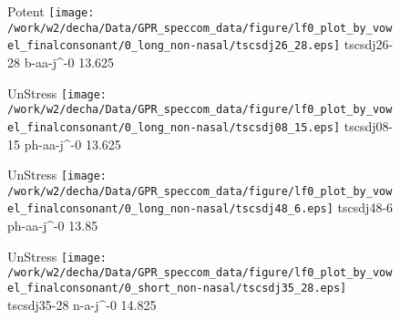 \documentclass{article}
\begin{document}
\begin{figure}[t]
\begin{minipage}[b]{.24\textwidth}
\colorbox{Apricot}{Potent}
\centering
\texttt{[image: /work/w2/decha/Data/GPR\_speccom\_data/figure/lf0\_plot\_by\_vowel\_finalconsonant/0\_long\_non-nasal/tscsdj26\_28.eps]}
tscsdj26-28 b-aa-j\textasciicircum-0 13.625
\end{minipage}
\begin{minipage}[b]{.24\textwidth}
UnStress
\centering
\texttt{[image: /work/w2/decha/Data/GPR\_speccom\_data/figure/lf0\_plot\_by\_vowel\_finalconsonant/0\_long\_non-nasal/tscsdj08\_15.eps]}
tscsdj08-15 ph-aa-j\textasciicircum-0 13.625
\end{minipage}
\begin{minipage}[b]{.24\textwidth}
UnStress
\centering
\texttt{[image: /work/w2/decha/Data/GPR\_speccom\_data/figure/lf0\_plot\_by\_vowel\_finalconsonant/0\_long\_non-nasal/tscsdj48\_6.eps]}
tscsdj48-6 ph-aa-j\textasciicircum-0 13.85
\end{minipage}
\begin{minipage}[b]{.24\textwidth}
UnStress
\centering
\texttt{[image: /work/w2/decha/Data/GPR\_speccom\_data/figure/lf0\_plot\_by\_vowel\_finalconsonant/0\_short\_non-nasal/tscsdj35\_28.eps]}
tscsdj35-28 n-a-j\textasciicircum-0 14.825
\end{minipage}
\end{figure}
\end{document}

